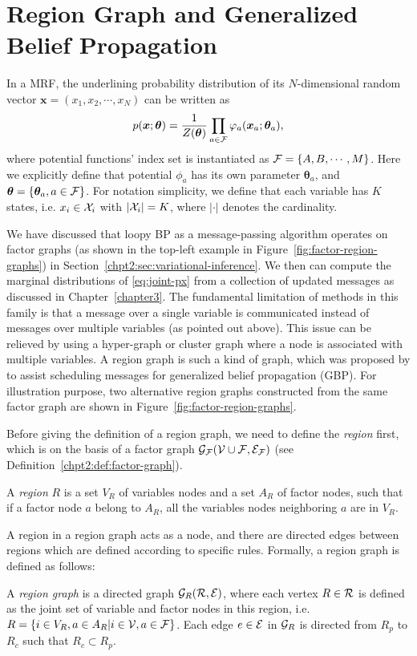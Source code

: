 \section{Region Graph and Generalized Belief Propagation}

In a MRF, the underlining probability distribution of its $N$-dimensional random vector $\bm{x}=(x_1, x_2, \cdots, x_N)$ can be written as
\begin{equation}\label{eq:joint-px}
  p(\bm{x}; \bm{\theta}) = \frac{1}{Z(\bm{\theta})} \prod_{a \in \mathcal{F}} \varphi_{a}(\bm{x}_{a}; \bm{\theta}_a),
\end{equation}
where potential functions' index set is instantiated as $\mathcal{F} = \left\{ A, B, \cdots, M \right\}$. Here we explicitly define that potential $\phi_a$ has its own parameter $\bm{\theta}_a$, and $\bm{\theta} = \{\bm{\theta}_a, a\in \mathcal{F}\}$. For notation simplicity, we define that each variable has $K$ states, i.e. $x_i \in \mathcal{X}_i$ with $|\mathcal{X}_i|=K$, where $|\cdot|$ denotes the cardinality.

We have discussed that loopy BP as a message-passing algorithm operates on factor graphs (as shown in the top-left example in Figure~\ref{fig:factor-region-graphs}) in Section~\ref{chpt2:sec:variational-inference}. We then can compute the marginal distributions of \eqref{eq:joint-px} from a collection of updated messages as discussed in Chapter~\ref{chapter3}. The fundamental limitation of methods in this family is that a message over a single variable is communicated instead of messages over multiple variables (as pointed out above). This issue can be relieved by using a hyper-graph or cluster graph where a node is associated with multiple variables. A region graph is such a kind of graph, which was proposed by \cite{yedida2005constucting, DBLP:journals/corr/abs-1207-4158} to assist scheduling messages for generalized belief propagation (GBP). For illustration purpose, two alternative region graphs constructed from the same factor graph are shown in Figure~\ref{fig:factor-region-graphs}.

Before giving the definition of a region graph, we need to define the \textit{region} first, which is on the basis of a factor graph $\mathcal{G}_{\mathcal{F}}(\mathcal{V} \cup \mathcal{F}, \mathcal{E}_{\mathcal{F}})$ (see Definition~\ref{chpt2:def:factor-graph}).
\begin{definition}
  A \textit{region} $R$ is a set $V_R$ of variables nodes and a set $A_R$ of factor nodes, such that if a factor node $a$ belong to $A_R$, all the variables nodes neighboring $a$ are in $V_R$.
\end{definition}
A region in a region graph acts as a node, and there are directed edges between regions which are defined according to specific rules. Formally, a region graph is defined as follows:
\begin{definition}\label{def:region-graph}
  A \textit{region graph} is  a directed graph $\mathcal{G}_R(\mathcal{R}, \mathcal{E})$, where each vertex $R \in \mathcal{R}$ is defined as the joint set of variable and factor nodes in this region, i.e. $R = \left\{ i \in V_R, a \in A_R | i \in \mathcal{V}, a \in \mathcal{F} \right\}$. Each edge $e \in \mathcal{E}$ in $\mathcal{G}_R$ is directed from $R_p$ to $R_c$ such that $R_c \subset R_p$. 
\end{definition}


